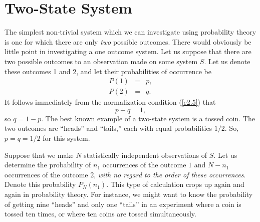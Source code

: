 \section{Two-State System}
The simplest non-trivial system which we can investigate using probability theory
is one for which there are only {\em two}
 possible outcomes. There would obviously 
be little
point in investigating a one outcome system. Let us 
suppose that there are two possible outcomes to an observation made
on some system $S$. Let us denote these outcomes 1 and 2, and let their 
probabilities of occurrence be
\begin{eqnarray}
P(1) &=& p,\\
P(2) &=& q.
\end{eqnarray}
It follows immediately from the normalization condition (\ref{e2.5}) that
\begin{equation}
p+q=1,
\end{equation}
so $q=1-p$. The best known example of a two-state system is
a tossed coin. The two outcomes are ``heads'' and ``tails,'' each with
equal probabilities $1/2$. So, $p=q=1/2$ for this system.

Suppose that we make $N$ statistically independent observations of $S$.
Let us determine the probability of $n_1$ occurrences of the outcome $1$
and $N-n_1$ occurrences of the outcome 2, {\em with no regard to the order
of these occurrences}. Denote this probability $P_N(n_1)$.
This type of calculation crops up again and again
in probability theory. For instance, we might want to know the probability
of getting nine ``heads'' and only one ``tails'' in an experiment where a coin is
tossed ten times, or where ten coins are tossed simultaneously.

